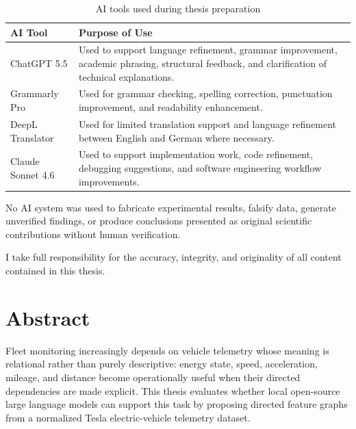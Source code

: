 \documentclass[a4paper,11pt,oneside,openany]{report}
\begin{document}
  \begin{table}[H]
    \centering
    \caption*{AI tools used during thesis preparation}
    \label{tab:ai_tools_declaration}
    \begin{tabularx}{\textwidth}{@{}L{0.27\textwidth}Y@{}}
      \toprule
      \textbf{AI Tool} & \textbf{Purpose of Use} \\
      \midrule
      ChatGPT 5.5 &
      Used to support language refinement, grammar improvement, academic
      phrasing, structural feedback, and clarification of technical
      explanations. \\
      Grammarly Pro &
      Used for grammar checking, spelling correction, punctuation improvement,
      and readability enhancement. \\
      DeepL Translator &
      Used for limited translation support and language refinement between
      English and German where necessary. \\
      Claude Sonnet 4.6 &
      Used to support implementation work, code refinement, debugging
      suggestions, and software engineering workflow improvements. \\
      \bottomrule
    \end{tabularx}
  \end{table}

  No AI system was used to fabricate experimental results, falsify data,
  generate unverified findings, or produce conclusions presented as original
  scientific contributions without human verification.

  I take full responsibility for the accuracy, integrity, and originality of all
  content contained in this thesis.

  \newpage

  \chapter*{Abstract}

  Fleet monitoring increasingly depends on vehicle telemetry whose meaning is
  relational rather than purely descriptive: energy state, speed,
  acceleration, mileage, and distance become operationally useful when their
  directed dependencies are made explicit. This thesis evaluates whether local
  open-source large language models can support this task by proposing
  directed feature graphs from a normalized Tesla electric-vehicle telemetry
  dataset.
\end{document}
